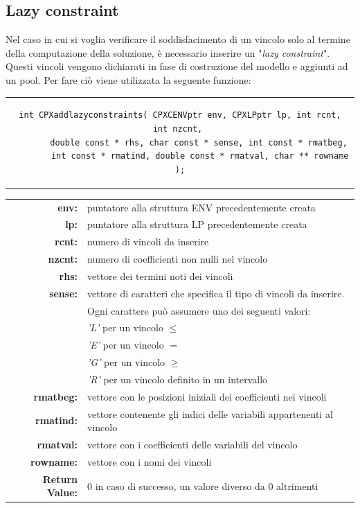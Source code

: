 \subsection{Lazy constraint}
Nel caso in cui si voglia verificare il soddisfacimento di un vincolo solo al termine della computazione della soluzione, è necessario inserire un "\textit{lazy constraint}". Questi vincoli vengono 
dichiarati in fase di costruzione del modello e aggiunti ad un pool. Per fare ciò viene utilizzata la seguente funzione:
\begin{center}
\begin{tabular}{c}
\begin{lstlisting}[linewidth=390pt, basicstyle=\footnotesize\sffamily,]  
int CPXaddlazyconstraints( CPXCENVptr env, CPXLPptr lp, int rcnt, int nzcnt, 
		double const * rhs, char const * sense, int const * rmatbeg, 
		int const * rmatind, double const * rmatval, char ** rowname );
\end{lstlisting}
\end{tabular}
\end{center}
\begin{table}[h]
\centering
\begin{tabular}{rl}
\textbf{env:} & {puntatore alla struttura ENV precedentemente creata}\\
\textbf{lp:} & {puntatore alla struttura LP precedentemente creata}\\
\textbf{rcnt:} & {numero di vincoli da inserire}\\
\textbf{nzcnt:} & {numero di coefficienti non nulli nel vincolo}\\ 
\textbf{rhs:} & {vettore dei termini noti dei vincoli}\\
\textbf{sense:} & {vettore di caratteri che specifica il tipo di vincoli da inserire.}\\
&{Ogni carattere può assumere uno dei seguenti valori:}\\
&{\textit{'L'} per un vincolo $\leq$}\\
&{\textit{'E'} per un vincolo $=$}\\
&{\textit{'G'} per un vincolo $\geq$}\\
&{\textit{'R'} per un vincolo definito in un intervallo}\\
\textbf{rmatbeg:} & {vettore con le posizioni iniziali dei coefficienti nei vincoli}\\
\textbf{rmatind:} & {vettore contenente gli indici delle variabili appartenenti al vincolo}\\
\textbf{rmatval:} & {vettore con i coefficienti delle variabili del vincolo}\\
\textbf{rowname:} & {vettore con i nomi dei vincoli}\\
\textbf{Return Value:} & {0 in caso di successo, un valore diverso da 0 altrimenti}\\
\end{tabular}
\end{table}
